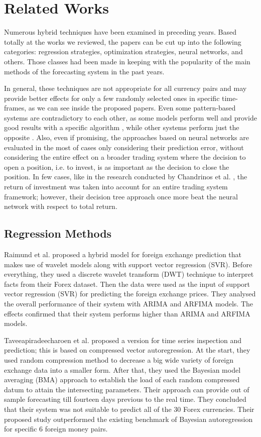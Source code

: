 \section{Related Works}
\label{sec:2}

Numerous hybrid techniques have been examined in preceding years. Based totally at the works we reviewed, the papers can be cut up into the following categories: regression strategies, optimization strategies, neural networks, and others. Those classes had been made in keeping with the popularity of the main methods of the forecasting system in the past years.

In general, these techniques are not appropriate for all currency pairs and may provide better effects for only a few randomly selected ones in specific time-frames, as we can see inside the proposed papers. 
Even some pattern-based systems are contradictory to each other, as some models perform well and provide good results with a specific algorithm \cite{8376549}, while other systems perform just the opposite \cite{CONTRERAS20181}.
Also, even if promising, the approaches based on neural networks are evaluated in the most of cases only considering their prediction error, without considering the entire effect on a broader trading system where the decision to open a position, i.e. to invest, is as important as the decision to close the position. In few cases, like in the research conducted by Chandrinos et al. \cite{Chandrinos18}, the return of investment was taken into account for an entire trading system framework; however, their decision tree approach once more beat the neural network with respect to total return. 


\subsection{Regression Methods}

Raimund et al. \cite{Raimundo18} proposed a hybrid model for foreign exchange prediction that makes use of wavelet models along with support vector regression (SVR). Before everything, they used a discrete wavelet transform (DWT) technique to interpret facts from their Forex dataset. Then the data were used as the input of support vector regression (SVR) for predicting the foreign exchange prices. They analysed the overall performance of their system with ARIMA and ARFIMA models. The effects confirmed that their system performs higher than ARIMA and ARFIMA models. 

Taveeapiradeecharoen et al. \citep{Taveeapiradeecharoen19} proposed a version for time series inspection and prediction; this is based on compressed vector autoregression. At the start, they used random compression method to decrease a big wide variety of foreign exchange data into a smaller form. After that, they used the Bayesian model averaging (BMA) approach to establish the load of each random compressed datum to attain the intersecting parameters. Their approach can provide out of sample forecasting till fourteen days previous to the real time. They concluded that their system was not suitable to predict all of the 30 Forex currencies. Their proposed study outperformed the existing benchmark of Bayesian autoregression for specific 6 foreign money pairs. 

